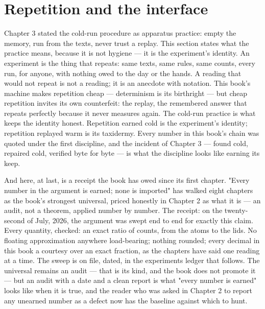 \section{Repetition and the interface}

Chapter 3 stated the cold-run procedure as apparatus practice: empty the memory, run
from the texts, never trust a replay. This section states what the practice means,
because it is not hygiene --- it is the experiment's identity. An experiment is the
thing that repeats: same texts, same rules, same counts, every run, for anyone, with
nothing owed to the day or the hands. A reading that would not repeat is not a
reading; it is an anecdote with notation. This book's machine makes repetition
cheap --- determinism is its birthright --- but cheap repetition invites its own
counterfeit: the replay, the remembered answer that repeats perfectly because it
never measures again. The cold-run practice is what keeps the identity honest.
Repetition earned cold is the experiment's identity; repetition replayed warm is
its taxidermy. Every number in this book's chain was quoted under the first
discipline, and the incident of Chapter 3 --- found cold, repaired cold, verified
byte for byte --- is what the discipline looks like earning its keep.

And here, at last, is a receipt the book has owed since its first chapter. "Every
number in the argument is earned; none is imported" has walked eight chapters as
the book's strongest universal, priced honestly in Chapter 2 as what it is --- an
audit, not a theorem, applied number by number. The receipt: on the twenty-second
of July, 2026, the argument was swept end to end for exactly this claim. Every
quantity, checked: an exact ratio of counts, from the atoms to the lids. No
floating approximation anywhere load-bearing; nothing rounded; every decimal in
this book a courtesy over an exact fraction, as the chapters have said one reading
at a time. The sweep is on file, dated, in the experiments ledger that follows.
The universal remains an audit --- that is its kind, and the book does not promote
it --- but an audit with a date and a clean report is what "every number is
earned" looks like when it is true, and the reader who was asked in Chapter 2 to
report any unearned number as a defect now has the baseline against which to hunt.

